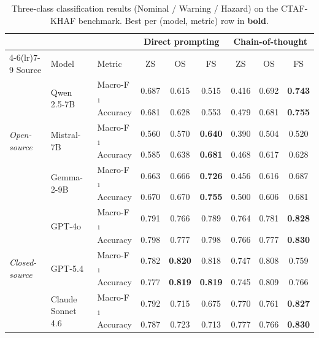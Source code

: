 \begin{table}[ht]
\centering
\caption{Three-class classification results (Nominal / Warning / Hazard) on the CTAF-KHAF benchmark. Best per (model, metric) row in \textbf{bold}.}
\label{tab:main_3class}
\renewcommand{\arraystretch}{1.10}
\small
\begin{tabular}{l l l *{6}{c}}
\toprule
 & & & \multicolumn{3}{c}{Direct prompting} & \multicolumn{3}{c}{Chain-of-thought} \\
\cmidrule(lr){4-6}\cmidrule(lr){7-9}
Source & Model & Metric & ZS & OS & FS & ZS & OS & FS \\
\midrule
  \multirow{6}{*}{\textit{Open-source}} & \multirow{2}{*}{Qwen 2.5-7B} & Macro-F$_1$ & 0.687 & 0.615 & 0.515 & 0.416 & 0.692 & \textbf{0.743} \\
   &  & Accuracy & 0.681 & 0.628 & 0.553 & 0.479 & 0.681 & \textbf{0.755} \\
\cmidrule(lr){2-9}
   & \multirow{2}{*}{Mistral-7B} & Macro-F$_1$ & 0.560 & 0.570 & \textbf{0.640} & 0.390 & 0.504 & 0.520 \\
   &  & Accuracy & 0.585 & 0.638 & \textbf{0.681} & 0.468 & 0.617 & 0.628 \\
\cmidrule(lr){2-9}
   & \multirow{2}{*}{Gemma-2-9B} & Macro-F$_1$ & 0.663 & 0.666 & \textbf{0.726} & 0.456 & 0.616 & 0.687 \\
   &  & Accuracy & 0.670 & 0.670 & \textbf{0.755} & 0.500 & 0.606 & 0.681 \\
\midrule
  \multirow{6}{*}{\textit{Closed-source}} & \multirow{2}{*}{GPT-4o} & Macro-F$_1$ & 0.791 & 0.766 & 0.789 & 0.764 & 0.781 & \textbf{0.828} \\
   &  & Accuracy & 0.798 & 0.777 & 0.798 & 0.766 & 0.777 & \textbf{0.830} \\
\cmidrule(lr){2-9}
   & \multirow{2}{*}{GPT-5.4} & Macro-F$_1$ & 0.782 & \textbf{0.820} & 0.818 & 0.747 & 0.808 & 0.759 \\
   &  & Accuracy & 0.777 & \textbf{0.819} & \textbf{0.819} & 0.745 & 0.809 & 0.766 \\
\cmidrule(lr){2-9}
   & \multirow{2}{*}{Claude Sonnet 4.6} & Macro-F$_1$ & 0.792 & 0.715 & 0.675 & 0.770 & 0.761 & \textbf{0.827} \\
   &  & Accuracy & 0.787 & 0.723 & 0.713 & 0.777 & 0.766 & \textbf{0.830} \\
\bottomrule
\end{tabular}
\end{table}